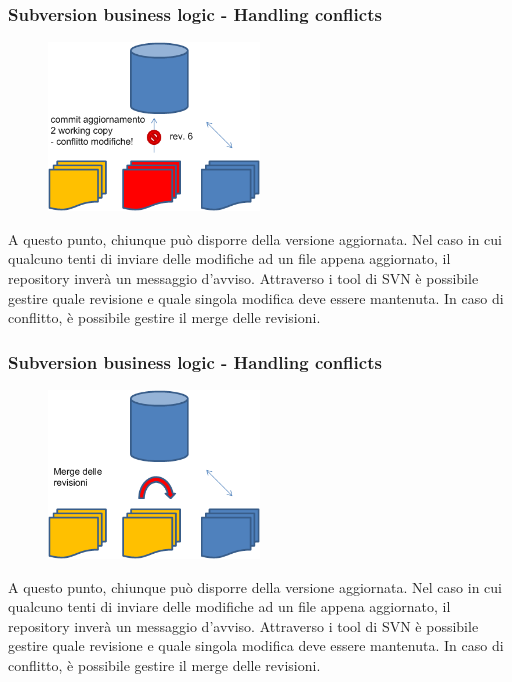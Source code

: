 \documentclass[10pt]{beamer}
\begin{document}
\begin{frame}[fragile]
\frametitle{Subversion business logic - Handling conflicts}
\begin{figure}[h]
 \centering
 \includegraphics[width=0.5\textwidth]{images/svn-step3.png}
\end{figure}
A questo punto, chiunque può disporre della versione aggiornata. Nel caso in cui qualcuno tenti di inviare delle modifiche ad un file appena aggiornato, il repository inverà un messaggio d’avviso.
Attraverso i tool di SVN è possibile gestire quale revisione e quale singola modifica deve essere mantenuta.
In caso di conflitto, è possibile gestire il merge delle revisioni.
\end{frame}

\begin{frame}[fragile]
\frametitle{Subversion business logic - Handling conflicts}
\begin{figure}[h]
 \centering
 \includegraphics[width=0.5\textwidth]{images/svn-step4.png}
\end{figure}
A questo punto, chiunque può disporre della versione aggiornata. Nel caso in cui qualcuno tenti di inviare delle modifiche ad un file appena aggiornato, il repository inverà un messaggio d’avviso.
Attraverso i tool di SVN è possibile gestire quale revisione e quale singola modifica deve essere mantenuta.
In caso di conflitto, è possibile gestire il merge delle revisioni.
\end{frame}
\end{document}
